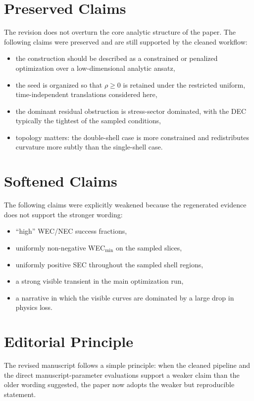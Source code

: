 \documentclass[11pt]{article}
\begin{document}
\section*{Preserved Claims}
The revision does not overturn the core analytic structure of the paper. The following claims were
preserved and are still supported by the cleaned workflow:
\begin{itemize}
\item the construction should be described as a constrained or penalized optimization over a
low-dimensional analytic ansatz,
\item the seed is organized so that $\rho \ge 0$ is retained under the restricted uniform,
time-independent translations considered here,
\item the dominant residual obstruction is stress-sector dominated, with the DEC typically the
tightest of the sampled conditions,
\item topology matters: the double-shell case is more constrained and redistributes curvature more
subtly than the single-shell case.
\end{itemize}

\section*{Softened Claims}
The following claims were explicitly weakened because the regenerated evidence does not support the
stronger wording:
\begin{itemize}
\item ``high'' WEC/NEC success fractions,
\item uniformly non-negative WEC$_{\min}$ on the sampled slices,
\item uniformly positive SEC throughout the sampled shell regions,
\item a strong visible transient in the main optimization run,
\item a narrative in which the visible curves are dominated by a large drop in physics loss.
\end{itemize}

\section*{Editorial Principle}
The revised manuscript follows a simple principle: when the cleaned pipeline and the direct
manuscript-parameter evaluations support a weaker claim than the older wording suggested, the paper
now adopts the weaker but reproducible statement.
\end{document}
